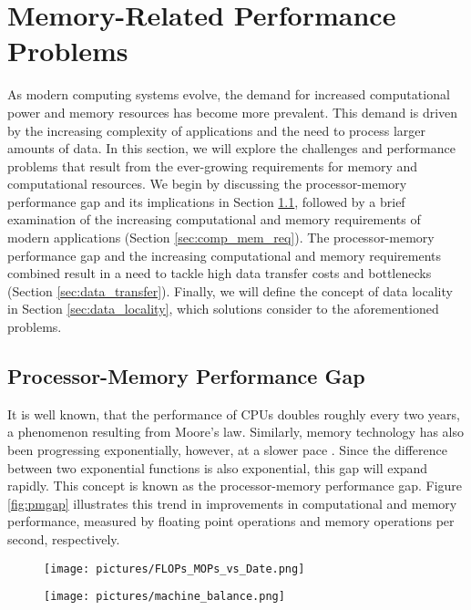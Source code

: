 \section{Memory-Related Performance Problems}\label{sec:background}
As modern computing systems evolve, the demand for increased computational power and memory resources has become more prevalent. This demand is driven by the increasing complexity of applications and the need to process larger amounts of data. In this section, we will explore the challenges and performance problems that result from the ever-growing requirements for memory and computational resources. We begin by discussing the processor-memory performance gap and its implications in Section \ref{sec:pmgap}, followed by a brief examination of the increasing computational and memory requirements of modern applications (Section \ref{sec:comp_mem_req}). The processor-memory performance gap and the increasing computational and memory requirements combined result in a need to tackle high data transfer costs and bottlenecks (Section \ref{sec:data_transfer}). Finally, we will define the concept of data locality in Section \ref{sec:data_locality}, which solutions consider to the aforementioned problems.

\subsection{Processor-Memory Performance Gap}\label{sec:pmgap}
It is well known, that the performance of CPUs doubles roughly every two years, a phenomenon resulting from Moore's law. Similarly, memory technology has also been progressing exponentially, however, at a slower pace \cite{efnusheva2017survey, machanick2002approaches, mckee2004reflections, mccalpin1997survey}. Since the difference between two exponential functions is also exponential, this gap will expand rapidly. This concept is known as the processor-memory performance gap. Figure \ref{fig:pmgap} illustrates this trend in improvements in computational and memory performance, measured by floating point operations and memory operations per second, respectively.

\begin{figure*}
	\begin{subfigure}{.5\textwidth}
		\centering
		\texttt{[image: pictures/FLOPs\_MOPs\_vs\_Date.png]}
	\end{subfigure}
	\begin{subfigure}{.5\textwidth}
		\centering
		\texttt{[image: pictures/machine\_balance.png]}
	\end{subfigure}
	\caption{Illustration of the expanding Processor-Memory Gap. The left graph charts the progression of FLOPs and MOPs on a logarithmic scale across various computing platforms, with the FLOPs trendline demonstrating a steeper ascent, indicative of the widening gap. The right figure depicts the development of the machine balance score for these platforms.\protect\footnotemark{}}
	\label{fig:pmgap}
\end{figure*}

